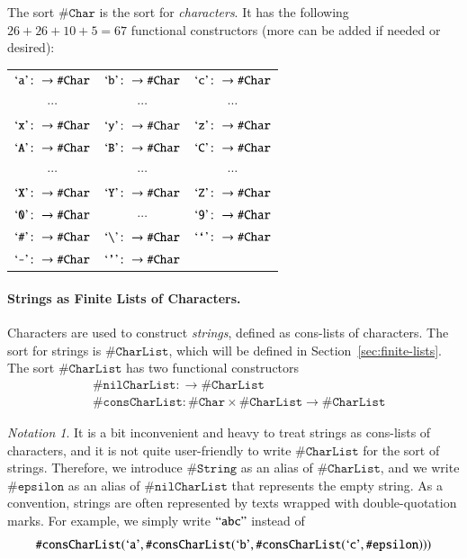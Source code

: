 \documentclass[UTF8,11pt]{article}
\newcounter{thmcounter}
\theoremstyle{plain}
\theoremstyle{definition}
\theoremstyle{remark}
\newtheorem{notation}   [thmcounter]{Notation}
\newcommand{\sharpsymbol}{\#}
\newcommand{\KChar}{\texttt{\sharpsymbol Char}}
\newcommand{\KCharList}{\texttt{\sharpsymbol CharList}}
\newcommand{\KString}{\texttt{\sharpsymbol String}}
\newcommand{\Kepsilon}{\texttt{\sharpsymbol epsilon}}
\newcommand{\KnilKCharList}{\texttt{\sharpsymbol nilCharList}}
\newcommand{\KconsKCharList}{\texttt{\sharpsymbol consCharList}}
\newcommand{\quottt}[1]{\textrm{\lq\texttt{#1}\rq}}
\newcommand{\qquottt}[1]{\textrm{``\texttt{#1}''}}
\newcommand{\slashsymbol}{\symbol{92}}
\begin{document}
The sort $\KChar$ is the sort for \emph{characters}. It has the following $26 +
26 + 10 + 5 = 67$ functional constructors (more can be added if needed or
desired):
\begin{center}
 \begin{tabular}{c c c}
  $\quottt{a} \colon \to \KChar$ & $\quottt{b} \colon \to \KChar$ &
  $\quottt{c} \colon \to \KChar$ \\
  $\cdots$ & $\cdots$ & $\cdots$ \\
  $\quottt{x} \colon \to \KChar$ & $\quottt{y} \colon \to \KChar$ &
  $\quottt{z} \colon \to \KChar$ \\
  $\quottt{A} \colon \to \KChar$ & $\quottt{B} \colon \to \KChar$ &
  $\quottt{C} \colon \to \KChar$ \\
  $\cdots$ & $\cdots$ & $\cdots$ \\
  $\quottt{X} \colon \to \KChar$ & $\quottt{Y} \colon \to \KChar$ &
  $\quottt{Z} \colon \to \KChar$ \\
  $\quottt{0} \colon \to \KChar$ & $\cdots$ & $\quottt{9} \colon \to
  \KChar$
  \\
  $\quottt{\sharpsymbol} \colon \to \KChar$ & $\quottt{\slashsymbol}
  \colon \to \KChar$ & $\quottt{`} \colon \to \KChar$
  \\
  $\quottt{-} \colon \to \KChar$ & $\quottt{'} \colon \to \KChar$
 \end{tabular}
\end{center}

\paragraph{Strings as Finite Lists of Characters.}
Characters are used to construct \emph{strings}, defined as cons-lists of
characters.
The sort for strings is $\KCharList$, which will be defined in
Section~\ref{sec:finite-lists}.
The sort $\KCharList$ has two functional constructors
\begin{align*}
& \KnilKCharList \colon \to \KCharList \\
& \KconsKCharList \colon \KChar \times \KCharList \to \KCharList
\end{align*}

\begin{notation}\label{not:strings}
It is a bit inconvenient and heavy to treat strings as cons-lists of
characters, and it is not quite user-friendly to write $\KCharList$ for the
sort of strings.
Therefore, we introduce $\KString$ as an alias of $\KCharList$, and we write
$\Kepsilon$ as an alias of $\KnilKCharList$ that represents the empty string.
As a convention, strings are often represented by texts wrapped with
double-quotation marks.
For example, we simply write $\qquottt{abc}$ instead of
 $$
 \KconsKCharList(\quottt{a}, \KconsKCharList(\quottt{b},
 \KconsKCharList(\quottt{c}, \Kepsilon)))
 $$
\end{notation}
\end{document}
